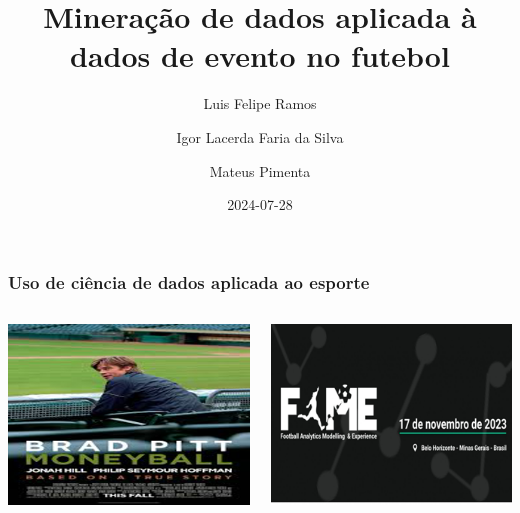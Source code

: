 \documentclass{beamer}
\title{Mineração de dados aplicada à dados de evento no futebol}
\author{Luis Felipe Ramos \and Igor Lacerda Faria da Silva \and Mateus Pimenta}
\date{2024-07-28}
\begin{document}
\frame{\titlepage}

\begin{frame}
\frametitle{Uso de ciência de dados aplicada ao esporte}

\begin{columns}
\begin{column}{0.5\textwidth}
\centering
\includegraphics[width=\linewidth]{moneyball.png}
\end{column}
\begin{column}{0.5\textwidth}
\centering
\includegraphics[width=\linewidth]{fame.png}
\end{column}
\end{columns}
\end{frame}
\end{document}
